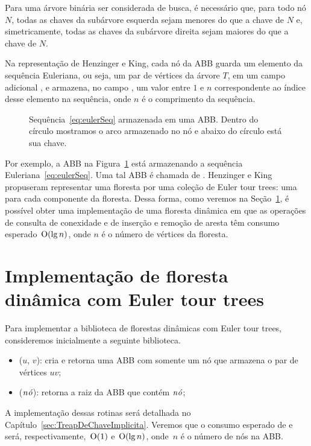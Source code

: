 Para uma árvore binária ser considerada de busca, é necessário que, para todo nó $N$, todas as chaves da subárvore esquerda sejam menores do que a chave de $N$ e, simetricamente, todas as chaves da subárvore direita sejam maiores do que a chave de $N$.

Na representação de Henzinger e King, cada nó da ABB guarda um elemento da sequência Euleriana, ou seja, um par de vértices da árvore $T$, em um campo adicional , e armazena, no campo , um valor entre $1$ e $n$ correspondente ao índice desse elemento na sequência, onde $n$ é o comprimento da sequência.

\begin{figure}[htb]
\centering
\caption{Sequência~\eqref{eq:eulerSeq}  armazenada em uma ABB. Dentro do círculo mostramos o arco armazenado no nó e abaixo do círculo está sua chave.}
\label{fig:seq-treap-indices}
\end{figure}

Por exemplo, a ABB na Figura~\ref{fig:seq-treap-indices} está armazenando a sequência Euleriana~\eqref{eq:eulerSeq}.
Uma tal ABB é chamada de . 
Henzinger e King propuseram representar uma floresta por uma coleção de Euler tour trees: uma para cada componente da floresta. 
Dessa forma, como veremos na Seção~\ref{sec:impleDF-ETT}, é possível obter uma implementação de uma floresta dinâmica em que as operações de consulta de conexidade e de inserção e remoção de aresta têm consumo esperado~$\mathrm{O}(\lg n)$, onde $n$ é o número de vértices da floresta.


\section{Implementação de floresta dinâmica com Euler tour trees}
\label{sec:impleDF-ETT}

Para implementar a biblioteca de florestas dinâmicas com Euler tour trees, consideremos inicialmente a seguinte biblioteca.

\begin{itemize}
\item  \treapCreate($u$, $v$): cria e retorna uma ABB com somente um nó que armazena o par de vértices $uv$;
\item \treapGetRoot($\mathit{n\acute{o}}$): retorna a raiz da ABB que contém $\mathit{n\acute{o}}$;
\end{itemize}

A implementação dessas rotinas será detalhada no Capítulo~\ref{sec:TreapDeChaveImplicita}. Veremos que o consumo esperado de \treapCreate{} e \treapGetRoot{} será, respectivamente,~$\mathrm{O}(1)$ e~$\mathrm{O}(\lg n)$, onde~$n$ é o número de nós na ABB.

